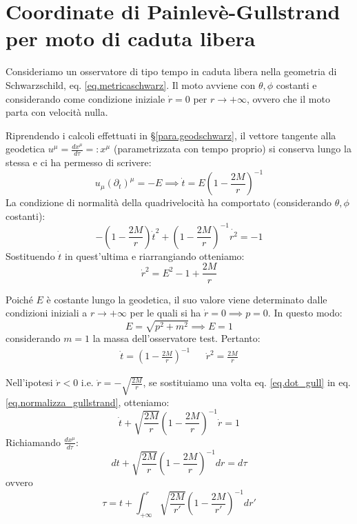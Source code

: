 \section{Coordinate di Painlevè-Gullstrand per moto di caduta libera}
Consideriamo un osservatore di tipo tempo in caduta libera nella geometria di Schwarzschild, eq. \ref{eq.metricaschwarz}. Il moto avviene con $\theta, \phi$ costanti e considerando come condizione iniziale $\dot{r}= 0$ per $r\rightarrow + \infty$, ovvero che il moto parta con velocità nulla.

Riprendendo i calcoli effettuati in \S\ref{para.geodschwarz}, il vettore tangente alla geodetica $u^\mu = \frac{d x^\mu}{d\tau} =: x^\mu$ (parametrizzata con tempo proprio) si conserva lungo la stessa e ci ha permesso di scrivere:
\begin{equation*}
    u_\mu(\partial_t)^\mu = - E \implies \dot{t} = E\left( 1 - \frac{2M}{r}\right)^{-1}
\end{equation*}
La condizione di normalità della quadrivelocità ha comportato (considerando $\theta,\phi$ costanti):
\begin{equation}
    -\left( 1 - \frac{2M}{r}\right)\dot{t}^2 + \left( 1 - \frac{2M}{r}\right)^{-1}\dot{r^2} = -1
    \label{eq.normalizza_gullstrand}
\end{equation}
Sostituendo $\dot{t}$ in quest'ultima e riarrangiando otteniamo:
\begin{equation*}
    \dot{r}^2 = E^2 -1 +\frac{2M}{r}
\end{equation*}

Poiché $E$ è costante lungo la geodetica, il suo valore viene determinato dalle condizioni iniziali a $r\rightarrow +\infty$ per le quali si ha $\dot{r}= 0 \implies p = 0$. In questo modo:
\begin{equation*}
    E = \sqrt{p^2 + m^2} \implies E = 1
\end{equation*}
considerando $m = 1$ la massa dell'osservatore test. Pertanto:
\begin{align}
    \dot{t} = \left( 1 - \frac{2M}{r}\right)^{-1} && \dot{r}^2 = \frac{2M}{r}
    \label{eq.dot_gull}
\end{align}

Nell'ipotesi $\dot{r}< 0$ i.e. $\dot{r} = - \sqrt{\frac{2M}{r}}$, se sostituiamo una volta eq. \ref{eq.dot_gull} in eq. \ref{eq.normalizza_gullstrand}, otteniamo:
\begin{equation*}
    \dot{t} + \sqrt{\frac{2M}{r}}\left( 1 - \frac{2M}{r}\right)^{-1}\dot{r} = 1
\end{equation*}
Richiamando $\frac{d x^\mu}{d\tau}$:
\begin{equation}
    dt + \sqrt{\frac{2M}{r}}\left( 1 - \frac{2M}{r}\right)^{-1} dr = d\tau
    \label{eq.dtau_gull}
\end{equation}
ovvero
\begin{equation*}
    \tau = t  + \int_{+\infty}^{r} \sqrt{\frac{2M}{r'}}\left( 1 - \frac{2M}{r'}\right)^{-1} dr'
\end{equation*}

